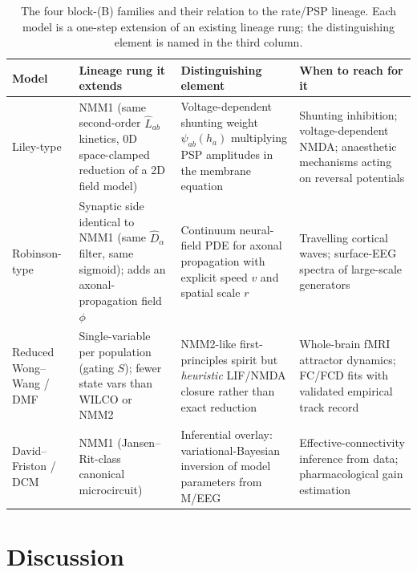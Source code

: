 \documentclass[11pt,a4paper]{article}
\begin{document}
\begin{table}[H]
  \centering
  \caption{The four block-(B) families and their relation to the rate/PSP lineage. Each model is a one-step extension of an existing lineage rung; the distinguishing element is named in the third column.}
  \label{tab:blockB}
  \footnotesize
  \begin{tabularx}{\textwidth}{@{}lXlX@{}}
    \toprule
    \textbf{Model} & \textbf{Lineage rung it extends} & \textbf{Distinguishing element} & \textbf{When to reach for it} \\
    \midrule
    Liley-type \cite{LileyCaduschWright1999,LileyCaduschDafilis2002,Dafilis2013}
      & NMM1 (same second-order $\hat L_{ab}$ kinetics, 0D space-clamped reduction of a 2D field model)
      & Voltage-dependent shunting weight $\psi_{ab}(h_a)$ multiplying PSP amplitudes in the membrane equation
      & Shunting inhibition; voltage-dependent NMDA; anaesthetic mechanisms acting on reversal potentials \\[4pt]
    Robinson-type \cite{Robinson2001,Rennie2002}
      & Synaptic side identical to NMM1 (same $\hat D_\alpha$ filter, same sigmoid); adds an axonal-propagation field $\phi$
      & Continuum neural-field PDE for axonal propagation with explicit speed $v$ and spatial scale $r$
      & Travelling cortical waves; surface-EEG spectra of large-scale generators \\[4pt]
    Reduced Wong--Wang / DMF \cite{WongWang2006,Deco2013}
      & Single-variable per population (gating $S$); fewer state vars than WILCO or NMM2
      & NMM2-like first-principles spirit but \emph{heuristic} LIF/NMDA closure rather than exact reduction
      & Whole-brain fMRI attractor dynamics; FC/FCD fits with validated empirical track record \\[4pt]
    David--Friston / DCM \cite{DavidFriston2003}
      & NMM1 (Jansen--Rit-class canonical microcircuit)
      & Inferential overlay: variational-Bayesian inversion of model parameters from M/EEG
      & Effective-connectivity inference from data; pharmacological gain estimation \\
    \bottomrule
  \end{tabularx}
\end{table}

\section{Discussion}
\label{sec:discussion}
\end{document}
